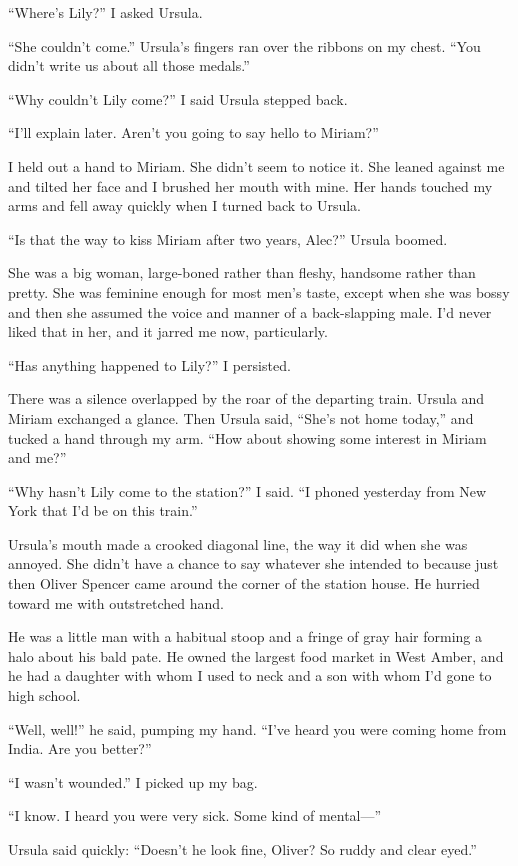 \documentclass{novel}
\begin{document}
“Where’s Lily?” I asked Ursula.

“She couldn’t come.” Ursula’s fingers ran over the ribbons on my chest. “You didn’t write us about all those medals.”

“Why couldn’t Lily come?” I said Ursula stepped back.

“I’ll explain later. Aren’t you going to say hello to Miriam?”

I held out a hand to Miriam. She didn’t seem to notice it. She leaned against me and tilted her face and I brushed her mouth with mine. Her hands touched my arms and fell away quickly when I turned back to Ursula.

“Is that the way to kiss Miriam after two years, Alec?” Ursula boomed.

She was a big woman, large-boned rather than fleshy, handsome rather than pretty. She was feminine enough for most men’s taste, except when she was bossy and then she assumed the voice and manner of a back-slapping male. I’d never liked that in her, and it jarred me now, particularly.

“Has anything happened to Lily?” I persisted.

There was a silence overlapped by the roar of the departing train. Ursula and Miriam exchanged a glance. Then Ursula said, “She’s not home today,” and tucked a hand through my arm. “How about showing some interest in Miriam and me?”

“Why hasn’t Lily come to the station?” I said. “I phoned yesterday from New York that I’d be on this train.”

Ursula’s mouth made a crooked diagonal line, the way it did when she was annoyed. She didn’t have a chance to say whatever she intended to because just then Oliver Spencer came around the corner of the station house. He hurried toward me with outstretched hand.

He was a little man with a habitual stoop and a fringe of gray hair forming a halo about his bald pate. He owned the largest food market in West Amber, and he had a daughter with whom I used to neck and a son with whom I’d gone to high school.

“Well, well!” he said, pumping my hand. “I’ve heard you were coming home from India. Are you better?”

“I wasn’t wounded.” I picked up my bag.

“I know. I heard you were very sick. Some kind of mental—”

Ursula said quickly: “Doesn’t he look fine, Oliver? So ruddy and clear eyed.”
\end{document}
